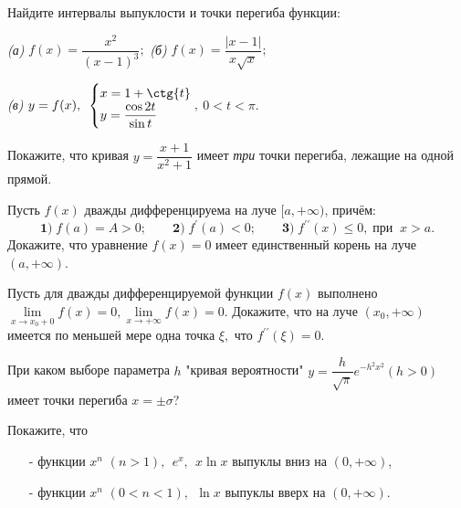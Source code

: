 \documentclass[10pt]{article}
\begin{document}
\begin{problem}
 Найдите интервалы выпуклости и точки перегиба функции:
\vspace{3ex}

\emph{(а)}  $f(x)=\dfrac{x^2}{(x-1)^3};$ \hspace{25ex}
\emph{(б)} $f(x)=\dfrac{|x-1|}{x\sqrt{x}};$
\vspace{2ex}

\emph{(в)} $y=f(x), \,\,\, \begin{cases}
x=1+\ctg{t}\\
y=\dfrac{\cos{2t}}{\sin{t}}
\end{cases}\!\!\!\!\!\!,
$ $0<t<\pi.$
\end{problem}

\begin{problem}
Покажите, что кривая $y = \dfrac{x+1}{x^2+1}$ имеет \emph{три} точки перегиба, лежащие на одной прямой.
\end{problem}

\begin{problem}
 Пусть $f(x)$ дважды дифференцируема на луче $[a , +\infty)$, причём:
$$\textbf{1)} \; f(a) = A > 0; \qquad \textbf{2)} \; f^{\prime}(a) < 0; \qquad \textbf{3)} \; f^{\prime \prime}(x) \le 0, \; \text{при} \;\; x > a.$$
Докажите, что уравнение $f(x)=0$ имеет единственный корень на луче $(a, +\infty)$.
\end{problem}

\begin{problem}
 Пусть для дважды дифференцируемой функции $f(x)$ выполнено
$\lim\limits_{x\rightarrow x_0+0} f(x) = 0, \lim\limits_{x\rightarrow +\infty} f(x) = 0$.
Докажите, что на луче $(x_0, +\infty)$ имеется по меньшей мере одна точка $\xi,$ что $f^{\prime \prime}(\xi)=0$.
\end{problem}

\begin{problem}
При каком выборе параметра $h$ "кривая вероятности" \newline $y=\dfrac{h}{\sqrt{\pi}}e^{-h^2x^2} (h>0)$ имеет точки перегиба $x=\pm \sigma$?
\end{problem}

\begin{problem}
Покажите, что
\begin{itemize}
\item[-] функции  $x^n \,\, (n>1), \;\, e^x, \;\, x \ln{x}$ выпуклы вниз на $(0,+\infty)$,
\item[-] функции $x^n \,\, (0<n<1), \;\, \ln{x}$ выпуклы вверх на $(0, +\infty)$.
\end{itemize}
\end{problem}
\end{document}
